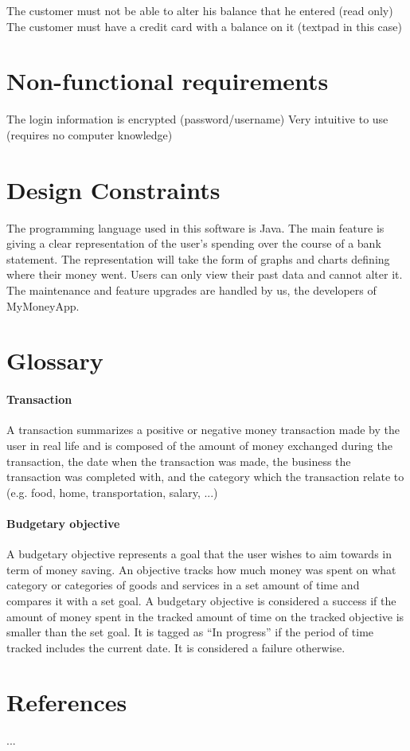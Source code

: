 \documentclass[letterpaper]{article}
\begin{document}
		The customer must not be able to alter his balance that he entered (read only)
		The customer must have a credit card with a balance on it (textpad in this case)
		
\section{Non-functional requirements}

	The login information is encrypted (password/username)
	Very intuitive to use (requires no computer knowledge)
	

\section{Design Constraints}

	The programming language used in this software is Java. The main feature is giving a clear representation of the user’s spending over the course of a bank statement. The representation will take the form of graphs and charts defining where their money went. Users can only view their past data and cannot alter it. The maintenance and feature upgrades are handled by us, the developers of MyMoneyApp.

\section{Glossary}

	\paragraph{Transaction}
	
		A transaction summarizes a positive or negative money transaction made by the user in real life and is composed of the amount of money exchanged during the transaction, the date when the transaction was made, the business the transaction was completed with, and the category which the transaction relate to (e.g. food, home, transportation, salary, ...)
	
	\paragraph{Budgetary objective}
	
		A budgetary objective represents a goal that the user wishes to aim towards in term of money saving. An objective tracks how much money was spent on what category or categories of goods and services in a set amount of time and compares it with a set goal. A budgetary objective is considered a success if the amount of money spent in the tracked amount of time on the tracked objective is smaller than the set goal. It is tagged as “In progress” if the period of time tracked includes the current date. It is considered a failure otherwise.

\section{References}

	...
	
\end{document}
